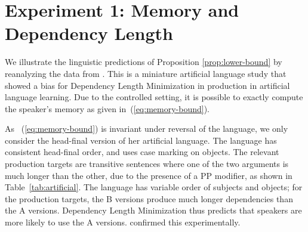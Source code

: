 \documentclass[11pt,letterpaper]{article}
\begin{document}
\section{Experiment 1: Memory and Dependency Length}




We illustrate the linguistic predictions of Proposition \ref{prop:lower-bound} by reanalyzing the data from \cite{fedzechkina-human-2017}.
This is a miniature artificial language study that showed a bias for Dependency Length Minimization in production in artificial language learning.
Due to the controlled setting, it is possible to exactly compute the speaker's memory as given in~(\ref{eq:memory-bound}).


As ~(\ref{eq:memory-bound}) is invariant under reversal of the language, we only consider the head-final version of her artificial language.
The language has consistent head-final order, and uses case marking on objects.
The relevant production targets are transitive sentences where one of the two arguments is much longer than the other, due to the presence of a PP modifier, as shown in Table~\ref{tab:artificial}.
The language has variable order of subjects and objects; for the production targets, the B versions produce much longer dependencies than the A versions.
Dependency Length Minimization thus predicts that speakers are more likely to use the A versions.
\cite{fedzechkina-human-2017} confirmed this experimentally.
\end{document}

